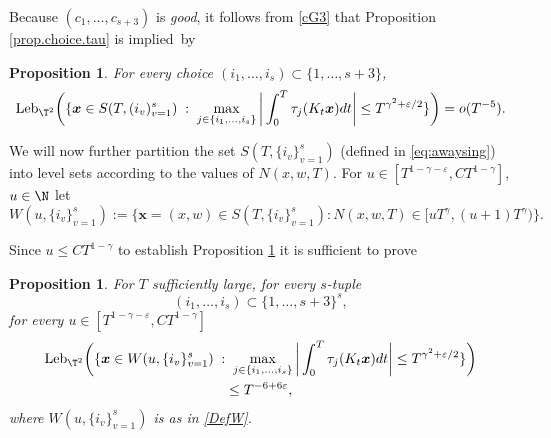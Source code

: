 \documentclass[10pt]{amsart}
\newcommand\bx{\boldsymbol{x}}
\newcommand\Leb{\mathrm{Leb}}
\let\eps\varepsilon
\theoremstyle{definition}
\theoremstyle{plain}
\newtheorem{proposition}[definition]{Proposition}
\begin{document}
Because $(c_1,\ldots,c_{s+3})$ is {\it good}, it follows from \eqref{cG3} that Proposition \ref{prop.choice.tau} is implied~by\enlargethispage{-\baselineskip}%

\begin{proposition} \label{prop.tau.S} For every choice
$(i_1,\ldots,i_s)\subset \{1,\ldots,s+3\}$,
\begin{equation*}%
\Leb_{\T^2}\bigg(\{\bx\in S(T,(i_v)_{v=1}^s)\;:\; \max_{j \in \{i_1,\ldots,i_s\}} \bigg|\int_{0}^T \tau_j(K_t\bx)dt\bigg|\leq T^{\gamma^2+\eps/2}\}\bigg)={o(T^{-5})}.
\end{equation*}
\end{proposition}

We will now further partition the set $S(T,\{i_v\}_{v=1}^s)$ (defined in \eqref{eq:awaysing}) into level sets according to the values
of $N(x,w,T)$. For $u\in [T^{1-\gamma-\eps},CT^{1-\gamma}]$, $u \in \N$ let
\begin{equation}
\label{DefW}
W(u,\{i_v\}_{v=1}^s):=\{\bx\!=\!(x,w)\!\in\! S(T,\{i_v\}_{v=1}^s): N(x,w,T)\!\in\! [uT^\gamma,(u+1)T^\gamma)\}.
\end{equation}

Since $u\leq CT^{1-\gamma}$ to establish Proposition \ref{prop.tau.S} it is sufficient to prove

\begin{proposition} \label{prop.tau.U} For $T$ sufficiently large, for every $s$-tuple
\[
(i_1,\ldots,i_s)\subset \{1,\ldots,s+3\}^s,
\]
for every $u\in [T^{1-\gamma-\eps},CT^{1-\gamma}]$
\begin{multline}\label{eq:sti}
\Leb_{\T^2}\bigg(\{\bx\in W(u,\{i_v\}_{v=1}^s)\;:\; \max_{j \in \{i_1,\ldots,i_s\}} \bigg|\int_{0}^T \tau_j(K_t\bx)dt\bigg|\leq T^{\gamma^2+\eps/2}\}\bigg)\\
\leq T^{-6+6\eps},
\end{multline}
where $W(u,\{i_v\}_{v=1}^s)$ is as in \eqref{DefW}.
\end{proposition}
\end{document}
